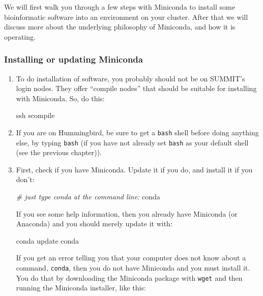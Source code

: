 \documentclass[]{krantz}
\makeatletter
\newenvironment{Shaded}{\begin{snugshade}}{\end{snugshade}}
\newcommand{\CommentTok}[1]{\textcolor[rgb]{0.37,0.37,0.37}{\textit{#1}}}
\newcommand{\ExtensionTok}[1]{#1}
\newcommand{\FunctionTok}[1]{\textcolor[rgb]{0,0,0}{#1}}
\newcommand{\NormalTok}[1]{#1}
\newenvironment{kframe}{%
\medskip{}
\setlength{\fboxsep}{.8em}
 \def\at@end@of@kframe{}%
 \ifinner\ifhmode%
  \def\at@end@of@kframe{\end{minipage}}%
  \begin{minipage}{\columnwidth}%
 \fi\fi%
 \def\FrameCommand##1{\hskip\@totalleftmargin \hskip-\fboxsep
 \colorbox{shadecolor}{##1}\hskip-\fboxsep
     \hskip-\linewidth \hskip-\@totalleftmargin \hskip\columnwidth}%
 \MakeFramed {\advance\hsize-\width
   \@totalleftmargin\z@ \linewidth\hsize
   \@setminipage}}%
 {\par\unskip\endMakeFramed%
 \at@end@of@kframe}
\renewenvironment{Shaded}{\begin{kframe}}{\end{kframe}}
\makeatother
\begin{document}
We will first walk you through a few steps with Miniconda to install some
bioinformatic software into an environment on your cluster. After that we will discuss more about
the underlying philosophy of Miniconda, and how it is operating.

\hypertarget{installing-or-updating-miniconda}{%
\subsubsection{Installing or updating Miniconda}\label{installing-or-updating-miniconda}}

\begin{enumerate}
\def\labelenumi{\arabic{enumi}.}
\item
  To do installation of software, you probably should not be on SUMMIT's login nodes.
  They offer ``compile nodes'' that should be suitable for installing with Miniconda. So, do this:

\begin{Shaded}
\begin{Highlighting}[]
\FunctionTok{ssh}\NormalTok{ scompile}
\end{Highlighting}
\end{Shaded}
\item
  If you are on Hummingbird, be sure to get a \texttt{bash} shell before doing anything else, by typing \texttt{bash}
  (if you have not already set \texttt{bash} as your default shell (see the previous chapter)).
\item
  First, check if you have Miniconda. Update it if you do, and install it if you don't:

\begin{Shaded}
\begin{Highlighting}[]
\CommentTok{# just type conda at the command line:}
\ExtensionTok{conda}
\end{Highlighting}
\end{Shaded}

  If you see some help information, then you already have Miniconda (or Anaconda) and you
  should merely update it with:

\begin{Shaded}
\begin{Highlighting}[]
\ExtensionTok{conda}\NormalTok{ update conda}
\end{Highlighting}
\end{Shaded}

  If you get an error telling you that your computer does not know about a command, \texttt{conda}, then
  you do not have Miniconda and you must install it. You do that by downloading the Miniconda package
  with \texttt{wget} and then running the Miniconda installer, like this:


\end{enumerate}
\end{document}
